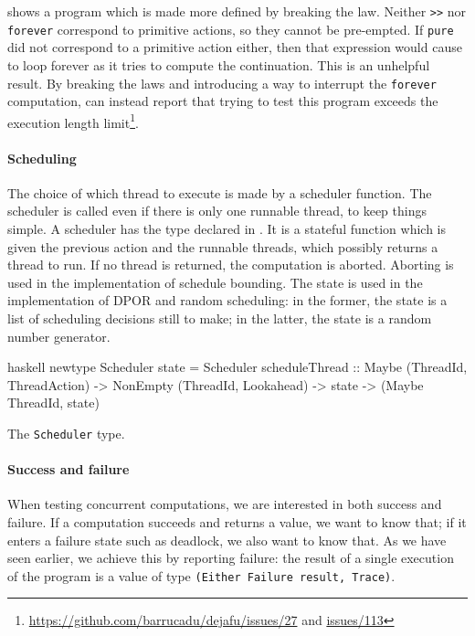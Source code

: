  shows a program which is made more defined by
breaking the law.  Neither \verb|>>| nor \verb|forever| correspond to
primitive actions, so they cannot be pre-empted.  If \verb|pure| did
not correspond to a primitive action either, then that expression
would cause \dejafu{} to loop forever as it tries to compute the
continuation.  This is an unhelpful result.  By breaking the laws and
introducing a way to interrupt the \verb|forever| computation,
\dejafu{} can instead report that trying to test this program exceeds
the execution length
limit\footnote{\url{https://github.com/barrucadu/dejafu/issues/27} and
  \url{issues/113}}.

\paragraph{Scheduling}
The choice of which thread to execute is made by a scheduler function.
The scheduler is called even if there is only one runnable thread, to
keep things simple.  A scheduler has the type declared in
.  It is a stateful function which is given the
previous action and the runnable threads, which possibly returns a
thread to run.  If no thread is returned, the computation is aborted.
Aborting is used in the implementation of schedule bounding.  The
state is used in the implementation of DPOR and random scheduling: in
the former, the state is a list of scheduling decisions still to make;
in the latter, the state is a random number generator.

\begin{listing}
\centering
\begin{cminted}{haskell}
newtype Scheduler state = Scheduler
  { scheduleThread
    :: Maybe (ThreadId, ThreadAction)
    -> NonEmpty (ThreadId, Lookahead)
    -> state
    -> (Maybe ThreadId, state)
  }
\end{cminted}
\caption{The \dejafu{} \texttt{Scheduler} type.}\label{lst:scheduler}
\end{listing}

\paragraph{Success and failure}
When testing concurrent computations, we are interested in both
success and failure.  If a computation succeeds and returns a value,
we want to know that; if it enters a failure state such as deadlock,
we also want to know that.  As we have seen earlier, we achieve this
by reporting failure: the result of a single execution of the program
is a value of type \verb|(Either Failure result, Trace)|.

